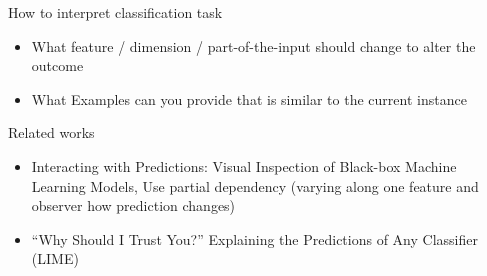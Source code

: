 \maketitle

How to interpret classification task
\begin{itemize}
    \item What feature / dimension / part-of-the-input should change to
    alter the outcome
    \item What Examples can you provide that is similar to the current
    instance

\end{itemize}

Related works
\begin{itemize}
    \item Interacting with Predictions: Visual Inspection of Black-box Machine Learning Models,
    Use partial dependency (varying along one feature and observer how prediction changes)
    \item “Why Should I Trust You?” Explaining the Predictions of Any Classifier (LIME)

\end{itemize}
